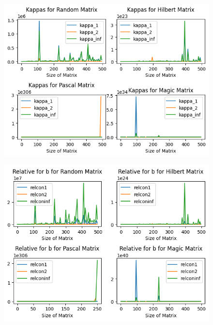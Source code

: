 \begin{solution}
 \begin{figure}
     \centering
     \includegraphics{Images/kappas.png}
     \label{fig:relcon}
 \end{figure}

 \begin{figure}
     \centering
     \includegraphics{Images/relb.png}
     \label{fig:relmags}
 \end{figure}
 \end{solution}

\newpage
